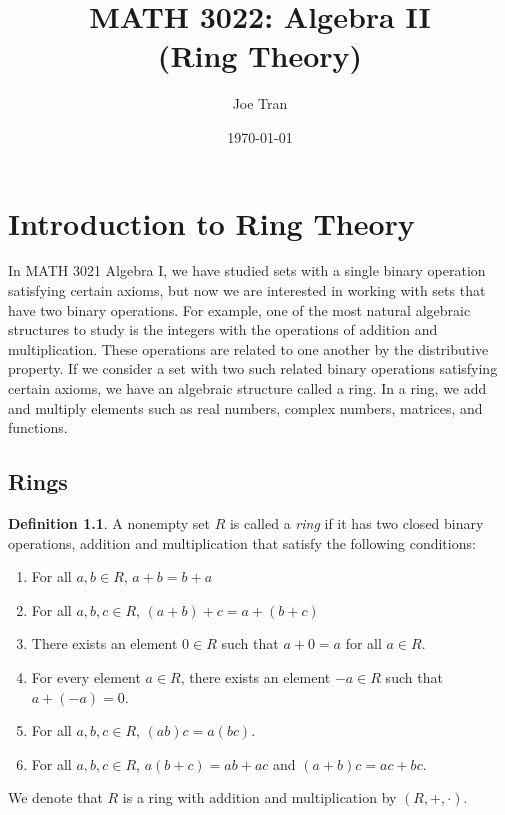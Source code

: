 \documentclass[11pt]{book}
\title{\textbf{MATH 3022: Algebra II \\ (Ring Theory)}}
\author{Joe Tran}
\date{\today}
\theoremstyle{definition}\newtheorem{definition}[subsection]{Definition}
\theoremstyle{definition}\newtheorem{example}[subsection]{Example}
\theoremstyle{definition}\newtheorem{notation}[subsection]{Notation}
\theoremstyle{definition}\newtheorem{remark}[subsection]{Remark}
\theoremstyle{theorem}\newtheorem{theorem}[subsection]{Theorem}
\theoremstyle{theorem}\newtheorem{lemma}[subsection]{Lemma}
\theoremstyle{theorem}\newtheorem{proposition}[subsection]{Proposition}
\theoremstyle{theorem}\newtheorem{corollary}[subsection]{Corollary}
\begin{document}
\maketitle

\tableofcontents

\chapter{Introduction to Ring Theory}

In MATH 3021 Algebra I, we have studied sets with a single binary operation satisfying certain axioms, but now we are interested in working with sets that have two binary operations. For example, one of the most natural algebraic structures to study is the integers with the operations of addition and multiplication. These operations are related to one another by the distributive property. If we consider a set with two such related binary operations satisfying certain axioms, we have an algebraic structure called a ring. In a ring, we add and multiply elements such as real numbers, complex numbers, matrices, and functions.

\section{Rings}

\begin{definition}\label{definition:1.1.1}
    A nonempty set $R$ is called a \emph{ring} if it has two closed binary operations, addition and multiplication that satisfy the following conditions:
    \begin{enumerate}
        \item For all $a, b \in R$, $a + b = b + a$
        \item For all $a, b, c \in R$, $(a + b) + c = a + (b + c)$
        \item There exists an element $0 \in R$ such that $a + 0 = a$ for all $a \in R$.
        \item For every element $a \in R$, there exists an element $-a \in R$ such that $a + (-a) = 0$.
        \item For all $a, b, c \in R$, $(ab)c = a(bc)$.
        \item For all $a, b, c \in R$, $a(b + c) = ab + ac$ and $(a + b)c = ac + bc$.
    \end{enumerate}
    We denote that $R$ is a ring with addition and multiplication by $(R, +, \cdot)$.
\end{definition}
\end{document}
